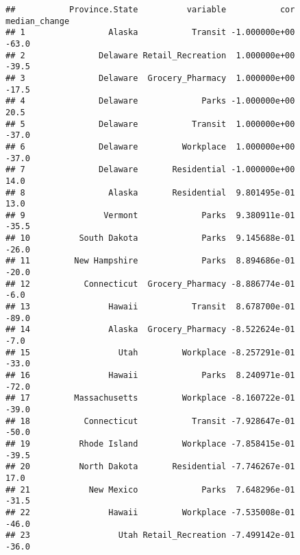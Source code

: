 \documentclass[]{article}
\newenvironment{Shaded}{\begin{snugshade}}{\end{snugshade}}
\newcommand{\KeywordTok}[1]{\textcolor[rgb]{0.13,0.29,0.53}{\textbf{{#1}}}}
\newcommand{\DataTypeTok}[1]{\textcolor[rgb]{0.13,0.29,0.53}{{#1}}}
\newcommand{\StringTok}[1]{\textcolor[rgb]{0.31,0.60,0.02}{{#1}}}
\newcommand{\NormalTok}[1]{{#1}}
\begin{document}
\begin{Shaded}
\end{Shaded}

\begin{verbatim}
##           Province.State          variable           cor median_change
## 1                 Alaska           Transit -1.000000e+00         -63.0
## 2               Delaware Retail_Recreation  1.000000e+00         -39.5
## 3               Delaware  Grocery_Pharmacy  1.000000e+00         -17.5
## 4               Delaware             Parks -1.000000e+00          20.5
## 5               Delaware           Transit  1.000000e+00         -37.0
## 6               Delaware         Workplace  1.000000e+00         -37.0
## 7               Delaware       Residential -1.000000e+00          14.0
## 8                 Alaska       Residential  9.801495e-01          13.0
## 9                Vermont             Parks  9.380911e-01         -35.5
## 10          South Dakota             Parks  9.145688e-01         -26.0
## 11         New Hampshire             Parks  8.894686e-01         -20.0
## 12           Connecticut  Grocery_Pharmacy -8.886774e-01          -6.0
## 13                Hawaii           Transit  8.678700e-01         -89.0
## 14                Alaska  Grocery_Pharmacy -8.522624e-01          -7.0
## 15                  Utah         Workplace -8.257291e-01         -33.0
## 16                Hawaii             Parks  8.240971e-01         -72.0
## 17         Massachusetts         Workplace -8.160722e-01         -39.0
## 18           Connecticut           Transit -7.928647e-01         -50.0
## 19          Rhode Island         Workplace -7.858415e-01         -39.5
## 20          North Dakota       Residential -7.746267e-01          17.0
## 21            New Mexico             Parks  7.648296e-01         -31.5
## 22                Hawaii         Workplace -7.535008e-01         -46.0
## 23                  Utah Retail_Recreation -7.499142e-01         -36.0

\end{verbatim}
\end{document}
